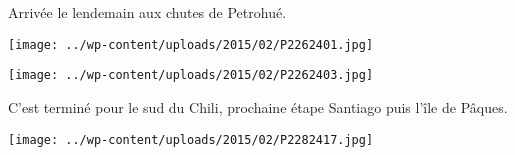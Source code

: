 \pagebreak
Arrivée le lendemain aux chutes de Petrohué.
\begin{center} \texttt{[image: ../wp-content/uploads/2015/02/P2262401.jpg]} \end{center}
\begin{center} \texttt{[image: ../wp-content/uploads/2015/02/P2262403.jpg]} \end{center}

\pagebreak
 C'est terminé pour le sud du Chili, prochaine étape Santiago puis l'île de Pâques.
\begin{center} \texttt{[image: ../wp-content/uploads/2015/02/P2282417.jpg]} \end{center}